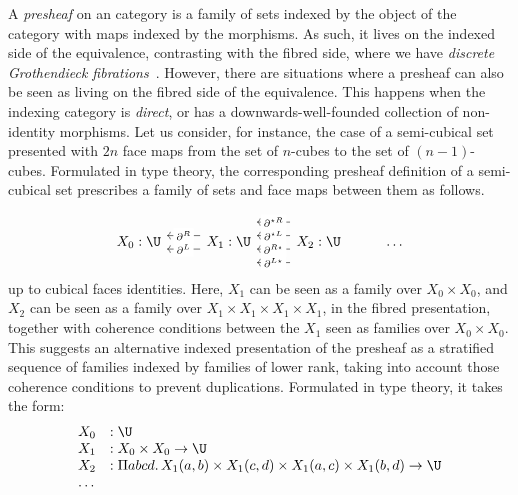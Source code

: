 \documentclass{msc}
\newcommand{\kstar}{{\star}}
\begin{document}
A \emph{presheaf} on an category is a family of sets indexed by the object of the category with maps indexed by the morphisms. As such, it lives on the indexed side of the equivalence, contrasting with the fibred side, where we have \emph{discrete Grothendieck fibrations}~\citep{LoregianRiehl20}. However, there are situations where a presheaf can also be seen as living on the fibred side of the equivalence. This happens when the indexing category is \emph{direct}, or has a downwards-well-founded collection of non-identity morphisms. Let us consider, for instance, the case of a semi-cubical set~\citep{grandis03,buchholtz17} presented with $2n$ face maps from the set of $n$-cubes to the set of $(n-1)$-cubes. Formulated in type theory, the corresponding presheaf definition of a semi-cubical set prescribes a family of sets and face maps between them as follows.

\begin{equation*}
  \begin{tikzcd}
    X_0: \U & X_1: \U \arrow[l, "\partial^L" description, shift left=2] \arrow[l, "\partial^R" description, shift right=2] & X_2: \U \arrow[l, "\partial^{L\kstar}" description, shift left=6] \arrow[l, "\partial^{R\kstar}" description, shift left=2] \arrow[l, "\partial^{\kstar L}" description, shift right=2] \arrow[l, "\partial^{\kstar R}" description, shift right=6] & \ldots
  \end{tikzcd}
\end{equation*}
up to cubical faces identities. Here, $X_1$ can be seen as a family over $X_0 \times X_0$, and $X_2$ can be seen as a family over $X_1 \times X_1 \times X_1 \times X_1$, in the fibred presentation, together with coherence conditions between the $X_1$ seen as families over $X_0 \times X_0$. This suggests an alternative indexed presentation of the presheaf as a stratified sequence of families indexed by families of lower rank, taking into account those coherence conditions to prevent duplications. Formulated in type theory, it takes the form:
\begin{equation*}
  \begin{array}{lll}
    X_0 & :               \U                                                                          \\
    X_1 & :               X_0 \times X_0 \rightarrow  \U                                              \\
    X_2 & : \Pi a b c d.\,  X_1(a,b) \times X_1 (c,d) \times X_1(a,c) \times X_1 (b,d) \rightarrow \U \\
    \ldots
  \end{array}
\end{equation*}
\end{document}
